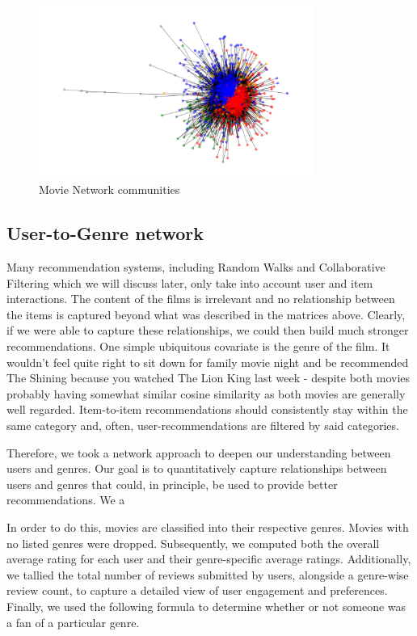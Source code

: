 \documentclass[12pt]{article}
\numberwithin{equation}{section}
\begin{document}
\begin{figure}[h!]
    \centering
  	\includegraphics[width=0.8\textwidth]{community_detection.png}
  	\caption{Movie Network communities}
  	\label{fig:comm_detection}
\end{figure}


\subsection{User-to-Genre network}

Many recommendation systems, including Random Walks and Collaborative Filtering which we will discuss later, only take into account user and item interactions. The content of the films is irrelevant and no relationship between the items is captured beyond what was described in the matrices above. Clearly, if we were able to capture these relationships, we could then build much stronger recommendations. One simple ubiquitous covariate is the genre of the film. It wouldn't feel quite right to sit down for family movie night and be recommended The Shining because you watched The Lion King last week - despite both movies probably having somewhat similar cosine similarity as both movies are generally well regarded. Item-to-item recommendations should consistently stay within the same category and, often, user-recommendations are filtered by said categories.

Therefore, we took a network approach to deepen our understanding between users and genres. Our goal is to quantitatively capture relationships between users and genres that could, in principle, be used to provide better recommendations. We a

In order to do this, movies are classified into their respective genres. Movies with no listed genres were dropped. Subsequently, we computed both the overall average rating for each user and their genre-specific average ratings. Additionally, we tallied the total number of reviews submitted by users, alongside a genre-wise review count, to capture a detailed view of user engagement and preferences. Finally, we used the following formula to determine whether or not someone was a fan of a particular genre. 
\end{document}
